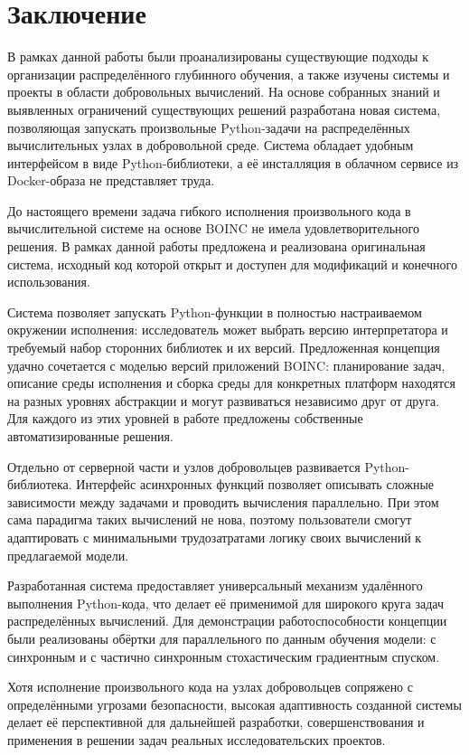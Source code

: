 \documentclass[a4paper,12pt]{extarticle}
\begin{document}
\section{Заключение}

В рамках данной работы были проанализированы существующие подходы к организации распределённого глубинного обучения, а также изучены системы и проекты в области добровольных вычислений.
На основе собранных знаний и выявленных ограничений существующих решений разработана новая система, позволяющая запускать произвольные Python-задачи на распределённых вычислительных узлах в добровольной среде.
Система обладает удобным интерфейсом в виде Python-библиотеки, а её инсталляция в облачном сервисе из Docker-образа не представляет труда.

До настоящего времени задача гибкого исполнения произвольного кода в вычислительной системе на основе BOINC не имела удовлетворительного решения.
В рамках данной работы предложена и реализована оригинальная система, исходный код которой открыт и доступен для модификаций и конечного использования.

Система позволяет запускать Python-функции в полностью настраиваемом окружении исполнения: исследователь может выбрать версию интерпретатора и требуемый набор сторонних библиотек и их версий.
Предложенная концепция удачно сочетается с моделью версий приложений BOINC: планирование задач, описание среды исполнения и сборка среды для конкретных платформ находятся на разных уровнях абстракции и могут развиваться независимо друг от друга.
Для каждого из этих уровней в работе предложены собственные автоматизированные решения.

Отдельно от серверной части и узлов добровольцев развивается Python-библиотека.
Интерфейс асинхронных функций позволяет описывать сложные зависимости между задачами и проводить вычисления параллельно.
При этом сама парадигма таких вычислений не нова, поэтому пользователи смогут адаптировать с минимальными трудозатратами логику своих вычислений к предлагаемой модели.

Разработанная система предоставляет универсальный механизм удалённого выполнения Python-кода, что делает её применимой для широкого круга задач распределённых вычислений.
Для демонстрации работоспособности концепции были реализованы обёртки для параллельного по данным обучения модели: с синхронным и с частично синхронным стохастическим градиентным спуском.

Хотя исполнение произвольного кода на узлах добровольцев сопряжено с определёнными угрозами безопасности, высокая адаптивность созданной системы делает её перспективной для дальнейшей разработки, совершенствования и применения в решении задач реальных исследовательских проектов.
\end{document}
